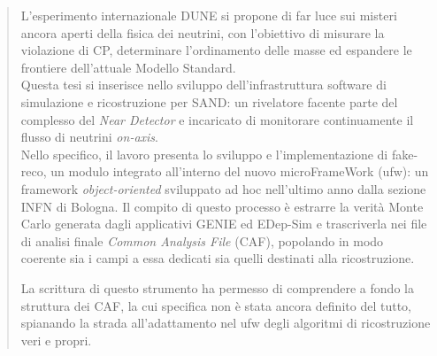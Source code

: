 \documentclass[main.tex]{subfiles}
\begin{document}
\begin{abstract}
  L'esperimento internazionale DUNE si propone di far luce sui misteri ancora
  aperti della fisica dei neutrini, con l'obiettivo di misurare la
  violazione di CP, determinare l'ordinamento delle masse ed espandere le
  frontiere dell'attuale Modello Standard.\\
  Questa tesi si inserisce nello sviluppo dell'infrastruttura software di
  simulazione e ricostruzione per SAND: un rivelatore facente parte del
  complesso del \textit{Near Detector} e incaricato di monitorare continuamente
  il flusso di neutrini \textit{on-axis}.\\
  Nello specifico, il lavoro presenta lo sviluppo e l'implementazione di
  fake-reco, un modulo integrato all'interno del nuovo microFrameWork (ufw):
  un framework \textit{object-oriented} sviluppato ad hoc nell'ultimo anno
  dalla sezione INFN di Bologna.
  Il compito di questo processo è estrarre la verità Monte Carlo generata
  dagli applicativi GENIE ed EDep-Sim e trascriverla nei file di analisi
  finale \textit{Common Analysis File} (CAF), popolando in modo coerente sia i
  campi a essa dedicati sia quelli destinati alla ricostruzione.

  La scrittura di questo strumento ha permesso di comprendere a fondo la
  struttura dei CAF, la cui specifica non è stata ancora definito del tutto,
  spianando la strada all'adattamento nel ufw degli algoritmi di
  ricostruzione veri e propri.
\end{abstract}
\end{document}
